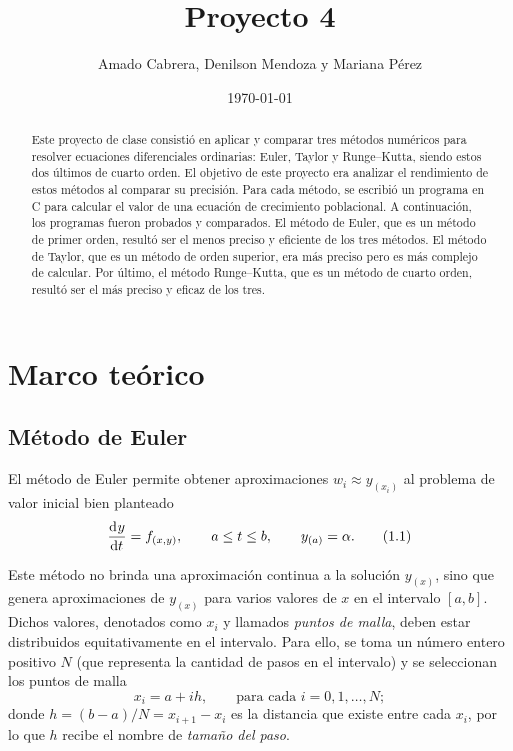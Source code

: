 \documentclass[english,spanish,Ce-table,Ce-theorem]{CabesHW}
\institute{Escuela de Ciencias Físicas y Matemática}
\title{Proyecto 4}
\author{Amado Cabrera, Denilson Mendoza y Mariana Pérez}
\date{\today}
\begin{document}
\maketitle

\begin{abstract}
Este proyecto de clase consistió en aplicar y comparar tres métodos numéricos para resolver ecuaciones diferenciales ordinarias: Euler, Taylor y Runge--Kutta, siendo estos dos últimos de cuarto orden. El objetivo de este proyecto era analizar el rendimiento de estos métodos al comparar su precisión. Para cada método, se escribió un programa en C para calcular el valor de una ecuación de crecimiento poblacional. A continuación, los programas fueron probados y comparados. El método de Euler, que es un método de primer orden, resultó ser el menos preciso y eficiente de los tres métodos. El método de Taylor, que es un método de orden superior, era más preciso pero es más complejo de calcular. Por último, el método Runge--Kutta, que es un método de cuarto orden, resultó ser el más preciso y eficaz de los tres.
\end{abstract}

\section{Marco teórico}
\subsection{Método de Euler}
El método de Euler permite obtener aproximaciones $w_i \approx y_{(x_i)}$ al problema de valor inicial bien planteado
\begin{align*}
\label{1.1}
    \td{y}{t} = f_{(x,y)}, \qquad a \leq t \leq b, \qquad y_{(a)} = \alpha. \tag{1.1}
\end{align*}

Este método no brinda una aproximación continua a la solución $y_{(x)}$, sino que genera aproximaciones de $y_{(x)}$ para varios valores de $x$ en el intervalo $[a, b]$. Dichos valores, denotados como $x_i$ y llamados \textit{puntos de malla}, deben estar distribuidos equitativamente en el intervalo. Para ello, se toma un número entero positivo $N$ (que representa la cantidad de pasos en el intervalo) y se seleccionan los puntos de malla
\[ x_i = a + ih, \qquad \text{para cada $i = 0, 1, \ldots, N$}; \]
donde $h = (b-a)/N = x_{i+1} - x_i$ es la distancia que existe entre cada $x_i$, por lo que $h$ recibe el nombre de \textit{tamaño del paso}.
\end{document}
